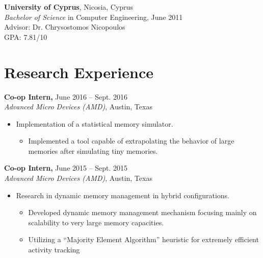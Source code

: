 \documentclass[11pt]{myres} %
\begin{document}
\begin{resume}
	{\color{blue}\textbf{University of Cyprus}, Nicosia, Cyprus} \\
	\emph{Bachelor of Science} in Computer Engineering, June 2011 \\
	Advisor: Dr. Chrysostomos Nicopoulos \\
	GPA: 7.81/10

\section{Research Experience}

{\color{blue}\textbf{Co-op Intern,} June 2016 -- Sept. 2016} \\
\emph{Advanced Micro Devices (AMD)}, Austin, Texas \\
\begin{itemize} \itemsep -2pt
    \item Implementation of a statistical memory simulator.
    \begin{itemize}
    	\item Implemented a tool capable of extrapolating the behavior of large memories after simulating tiny memories.
    \end{itemize}
\end{itemize}

{\color{blue}\textbf{Co-op Intern,} June 2015 -- Sept. 2015} \\
\emph{Advanced Micro Devices (AMD)}, Austin, Texas \\
\begin{itemize} \itemsep -2pt
    \item Research in dynamic memory management in hybrid configurations.
    \begin{itemize}
    	\item Developed dynamic memory management mechanism focusing mainly on scalability to very large memory capacities.
    	\item Utilizing a ``Majority Element Algorithm'' heuristic for extremely efficient activity tracking
    \end{itemize}
\end{itemize}


\end{resume}
\end{document}
